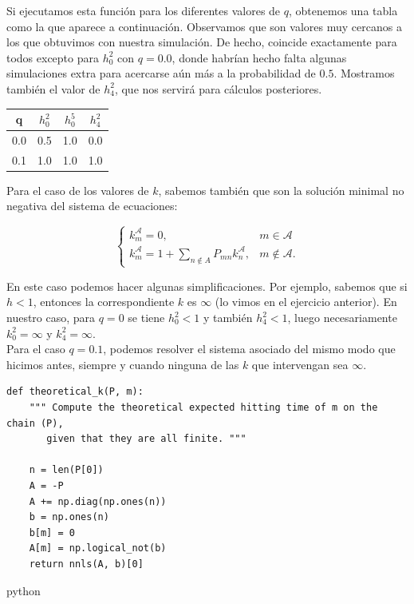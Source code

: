 \documentclass[11pt,a4paper]{article}
\begin{document}
Si ejecutamos esta función para los diferentes valores de $q$, obtenemos una tabla como la que aparece a continuación. Observamos que son valores muy cercanos a los que obtuvimos con nuestra simulación. De hecho, coincide exactamente para todos excepto para $h_0^2$ con $q=0.0$, donde habrían hecho falta algunas simulaciones extra para acercarse aún más a la probabilidad de $0.5$. Mostramos también el valor de $h_4^2$, que nos servirá para cálculos posteriores.

\begin{table}[h!]
  \centering
  \begin{tabular}{c|c|c|c}
    \textbf{q} & \textbf{$h_0^2$} & \textbf{$h_0^5$} & \textbf{$h_4^2$}\\ \hline
    0.0 & 0.5 & 1.0 & 0.0 \\
    0.1 & 1.0 & 1.0 & 1.0\\
  \end{tabular}
\end{table}

Para el caso de los valores de $k$, sabemos también que son la solución minimal no negativa del sistema de ecuaciones:

\[
\begin{cases}
  k_m^{\mathcal A} = 0, & m \in \mathcal A\\
  k_m^{\mathcal A} = 1 + \sum_{n \notin A} P_{mn}k_n^{\mathcal A}, & m \notin \mathcal A.
\end{cases}
\]

En este caso podemos hacer algunas simplificaciones. Por ejemplo, sabemos que si $h<1$, entonces la correspondiente $k$ es $\infty$ (lo vimos en el ejercicio anterior). En nuestro caso, para $q=0$ se tiene $h_0^2<1$ y también $h_4^2<1$, luego necesariamente $k_0^2=\infty$ y $k_4^2=\infty$.\\

Para el caso $q=0.1$, podemos resolver el sistema asociado del mismo modo que hicimos antes, siempre y cuando ninguna de las $k$ que intervengan sea $\infty$.

\begin{verbatim}
def theoretical_k(P, m):
    """ Compute the theoretical expected hitting time of m on the chain (P),
       given that they are all finite. """

    n = len(P[0])
    A = -P
    A += np.diag(np.ones(n))
    b = np.ones(n)
    b[m] = 0
    A[m] = np.logical_not(b)
    return nnls(A, b)[0]
\end{verbatim}{python}
\end{document}
